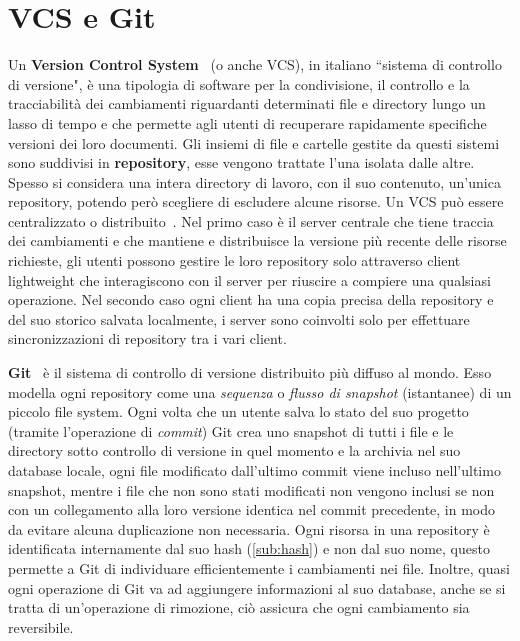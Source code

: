 \section{VCS e Git}
\label{sub:vcs}
Un \textbf{Version Control System}~\cite{vcs1} (o anche VCS), in italiano ``sistema di controllo di versione",
è una tipologia di software per la condivisione,
il controllo e la tracciabilità dei cambiamenti riguardanti determinati file e directory
lungo un lasso di tempo e che permette agli utenti di recuperare rapidamente specifiche
versioni dei loro documenti. Gli insiemi di file e cartelle gestite da questi sistemi
sono suddivisi in \textbf{repository}, esse vengono trattate l'una isolata dalle altre.
Spesso si considera una intera directory di lavoro, con il suo contenuto,
un'unica repository, potendo però scegliere di escludere alcune risorse.
Un VCS può essere centralizzato o distribuito~\cite{vcs2}.
Nel primo caso è il server centrale che tiene traccia dei cambiamenti e che mantiene e
distribuisce la versione più recente delle risorse richieste, gli utenti possono gestire
le loro repository solo attraverso client lightweight che interagiscono con il server
per riuscire a compiere una qualsiasi operazione.
Nel secondo caso ogni client ha una copia precisa della repository e del suo storico
salvata localmente, i server sono coinvolti solo per effettuare sincronizzazioni
di repository tra i vari client. 

\label{sub:git}
\textbf{Git}~\cite{git-21} è il sistema di controllo di versione distribuito più diffuso al mondo.
Esso modella ogni repository come una \emph{sequenza} o \emph{flusso di snapshot} (istantanee)
di un piccolo file system. Ogni volta che un utente salva lo stato del suo progetto
(tramite l'operazione di \emph{commit}) Git crea uno snapshot di tutti i file e le directory
sotto controllo di versione in quel momento e la archivia nel suo database locale, ogni
file modificato dall'ultimo commit viene incluso nell'ultimo snapshot, mentre i file che
non sono stati modificati non vengono inclusi se non con un collegamento alla loro versione identica
nel commit precedente, in modo da evitare alcuna duplicazione non necessaria.
Ogni risorsa in una repository è identificata internamente dal suo hash (\autoref{sub:hash}) e non dal suo nome,
questo permette a Git di individuare efficientemente i cambiamenti nei file.
Inoltre, quasi ogni operazione di Git va ad aggiungere informazioni al suo database, anche se si tratta
di un'operazione di rimozione, ciò assicura che ogni cambiamento sia reversibile.

